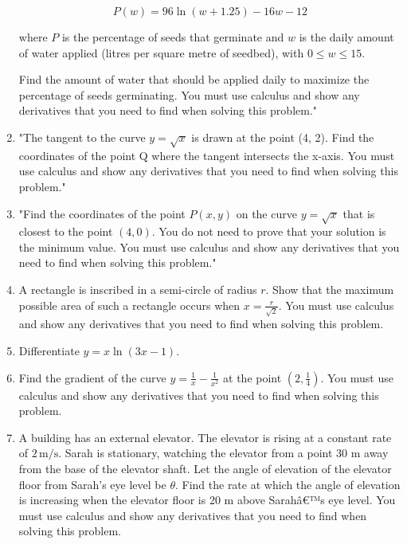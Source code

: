 \documentclass{article}
\begin{document}
\begin{enumerate}
\[ P(w) = 96 \ln(w + 1.25) - 16w - 12 \]

where \( P \) is the percentage of seeds that germinate and \( w \) is the daily amount of water applied (litres per square metre of seedbed), with \( 0 \leq w \leq 15 \).

Find the amount of water that should be applied daily to maximize the percentage of seeds germinating. You must use calculus and show any derivatives that you need to find when solving this problem."
\vspace{3cm}
\item "The tangent to the curve \( y = \sqrt{x} \) is drawn at the point (4, 2). Find the coordinates of the point Q where the tangent intersects the x-axis. You must use calculus and show any derivatives that you need to find when solving this problem."
\vspace{3cm}
\item "Find the coordinates of the point \( P(x, y) \) on the curve \( y = \sqrt{x} \) that is closest to the point \( (4, 0) \). You do not need to prove that your solution is the minimum value. You must use calculus and show any derivatives that you need to find when solving this problem."
\vspace{3cm}
\item A rectangle is inscribed in a semi-circle of radius \( r \). Show that the maximum possible area of such a rectangle occurs when \( x = \frac{r}{\sqrt{2}} \). You must use calculus and show any derivatives that you need to find when solving this problem.
\vspace{3cm}
\item Differentiate \( y = x \ln(3x - 1) \).
\vspace{3cm}
\item Find the gradient of the curve \( y = \frac{1}{x} - \frac{1}{x^2} \) at the point \( \left( 2, \frac{1}{4} \right) \). You must use calculus and show any derivatives that you need to find when solving this problem.
\vspace{3cm}
\item A building has an external elevator. The elevator is rising at a constant rate of \(2 \, \text{m/s}\). Sarah is stationary, watching the elevator from a point 30 m away from the base of the elevator shaft. Let the angle of elevation of the elevator floor from Sarah's eye level be \(\theta\). Find the rate at which the angle of elevation is increasing when the elevator floor is 20 m above Sarahâ€™s eye level. You must use calculus and show any derivatives that you need to find when solving this problem.

\end{enumerate}
\end{document}
